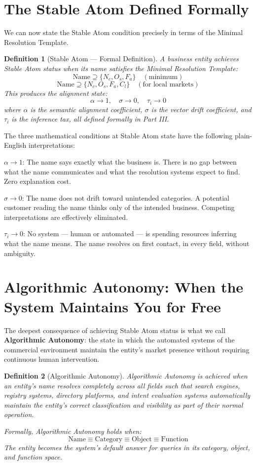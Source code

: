 \documentclass[12pt, openany]{book}
\theoremstyle{thmstyle}
\theoremstyle{defstyle}
\newtheorem{definition}{Definition}[chapter]
\newcommand{\Nc}{N_c}
\newcommand{\Os}{O_s}
\newcommand{\Fa}{F_a}
\newcommand{\Cl}{C_l}
\newcommand{\taui}{\tau_i}
\begin{document}
\section{The Stable Atom Defined Formally}

We can now state the Stable Atom condition precisely in terms of the Minimal Resolution Template.

\begin{definition}[Stable Atom --- Formal Definition]
A business entity achieves Stable Atom status when its name satisfies the Minimal Resolution Template:
\[
\text{Name} \supseteq \{\Nc, \Os, \Fa\} \quad (\text{minimum})
\]
\[
\text{Name} \supseteq \{\Nc, \Os, \Fa, \Cl\} \quad (\text{for local markets})
\]
This produces the alignment state:
\[
\alpha \to 1, \quad \sigma \to 0, \quad \tau_i \to 0
\]
where $\alpha$ is the semantic alignment coefficient, $\sigma$ is the vector drift coefficient, and $\taui$ is the inference tax, all defined formally in Part III.
\end{definition}

The three mathematical conditions at Stable Atom state have the following plain-English interpretations:

$\alpha \to 1$: The name says exactly what the business is. There is no gap between what the name communicates and what the resolution systems expect to find. Zero explanation cost.

$\sigma \to 0$: The name does not drift toward unintended categories. A potential customer reading the name thinks only of the intended business. Competing interpretations are effectively eliminated.

$\taui \to 0$: No system --- human or automated --- is spending resources inferring what the name means. The name resolves on first contact, in every field, without ambiguity.

\section{Algorithmic Autonomy: When the System Maintains You for Free}

The deepest consequence of achieving Stable Atom status is what we call \textbf{Algorithmic Autonomy}: the state in which the automated systems of the commercial environment maintain the entity's market presence without requiring continuous human intervention.

\begin{definition}[Algorithmic Autonomy]
Algorithmic Autonomy is achieved when an entity's name resolves completely across all fields such that search engines, registry systems, directory platforms, and intent evaluation systems automatically maintain the entity's correct classification and visibility as part of their normal operation.

Formally, Algorithmic Autonomy holds when:
\[
\text{Name} \equiv \text{Category} \equiv \text{Object} \equiv \text{Function}
\]
The entity becomes the system's default answer for queries in its category, object, and function space.
\end{definition}
\end{document}

